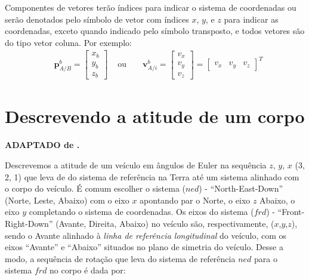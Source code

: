 Componentes de vetores terão índices para indicar o sistema de coordenadas ou serão denotados pelo símbolo de vetor com índices \(x\), \(y\), e \(z\) para indicar as coordenadas, exceto quando indicado pelo símbolo transposto, e todos vetores são do tipo vetor coluna. Por exemplo:
\begin{align*}
    &\mathbf{p}^{b}_{A/B} = \begin{bmatrix}x_{b} \\ y_{b} \\ z_{b}\end{bmatrix}&
    \text{ ou }&
    &\mathbf{v}^{b}_{A/i} = \begin{bmatrix} v_{x} \\ v_{y} \\ v_{z} \end{bmatrix} = \begin{bmatrix} v_{x} & v_{y} & v_{z} \end{bmatrix}^{T}
\end{align*}


\section{Descrevendo a atitude de um corpo}

\textbf{ADAPTADO de .}

Descrevemos a atitude de um veículo em ângulos de Euler na sequência \(z\), \(y\), \(x\) (3, 2, 1) que leva de do sistema de referência na Terra até um sistema alinhado com o corpo do veículo. É comum escolher o sistema (\(ned\)) - ``North-East-Down'' (Norte, Leste, Abaixo) com o eixo \(x\) apontando par o Norte, o eixo \(z\) Abaixo, o eixo \(y\) completando o sistema de coordenadas. Os eixos do sistema (\(frd\)) - ``Front-Right-Down'' (Avante, Direita, Abaixo) no veículo são, respectivamente, (\(x\),\(y\),\(z\)), sendo o Avante alinhado à \emph{linha de referência longitudinal} do veículo, com os eixos  ``Avante'' e ``Abaixo'' situados no plano de simetria do veículo. Desse a modo, a sequência de rotação que leva do sistema de referência \(ned\) para o sistema \(frd\) no corpo é dada por:

